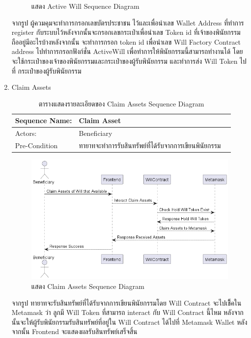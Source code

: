 \documentclass[12pt,oneside,openright,a4paper]{cpe-thai-project}
\begin{document}
\begin{enumerate}[label=\thesubsection.\arabic*,leftmargin=0pt,itemindent=1.25cm]
\begin{figure}[!thb]
			\caption{แสดง Active Will Sequence Diagram}
		\end{figure}
		\FloatBarrier
	\tab จากรูป ผู้ควมคุมจะทำการกรอกเลขบัตรประชาชน ไว้และเพื่อนำเลข Wallet Address ที่ทำการ register กับระบบไว้หลังจากนั้นจะกรอกเลขกระเป๋าเพื่อนำเลข Token id ที่เจ้าของพินัยกรรมถืออยู่มีอะไรบ้างหลังจากนั้น จะทำการกรอก token id เพื่อนำเลข Will Factory Contract address ไปทำการกรอกฟังก์ชั่น ActiveWill เพื่อทำการให้พินัยกรรมนี้สามารถทำงานได้ โดยจะใช้กระเป๋าของเจ้าของพินัยกรรมและกระเป๋าของผู้รับพินัยกรรม และทำการส่ง Will Token ไปที่ กระเป๋าของผู้รับพินัยกรรม
	\item Claim Assets
	\begin{table}[h]
\centering
\caption{ตารางแสดงรายละเอียดของ Claim Assets Sequence Diagram}
\begin{tabularx}{\textwidth}{|l|X|X|} 
\hline
Sequence Name: & Claim Asset                                             \\ 
\hline
Actors:        & Beneficiary                                            \\ 
\hline
Pre-Condition  & ทายาทจะทำการรับสินทรัพย์ที่ได้รับจากการเขียนพินัยกรรม  \\
\hline
\end{tabularx}
\end{table}
		\begin{figure}[!thb]
			\centering
			\includegraphics[scale=0.45]{claimAssetseq}
			\caption{แสดง Claim Assets Sequence Diagram}
		\end{figure}
		\FloatBarrier
	\tab จากรูป ทายาทจะรับสินทรัพย์ที่ได้รับจากการเขียนพินัยกรรมโดย Will Contract จะไปเช็ึคใน Metamask ว่า ลูกมี Will Token ที่สามารถ interact กับ Will Contract นี้ไหม หลังจากนั้นจะให้ผู้รับพินัยกรรมรับสินทรัพย์ที่อยู่ใน Will Contract ได้ไปที่ Metamask Wallet หลังจากนั้น Frontend จะแสดงผลรับสินทรัพย์เสร็จสิ้น
	\end{enumerate}
\clearpage
\end{document}
